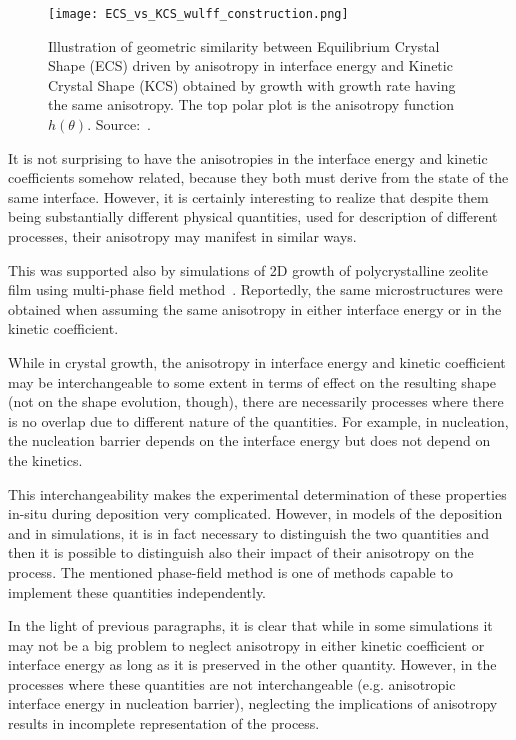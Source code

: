 \begin{figure}
	\centering
	\texttt{[image: ECS\_vs\_KCS\_wulff\_construction.png]}
	\caption{Illustration of geometric similarity between Equilibrium Crystal Shape (ECS) driven by anisotropy in interface energy and Kinetic Crystal Shape (KCS) obtained by growth with growth rate having the same anisotropy. The top polar plot is the anisotropy function $h(\theta)$. Source:~\cite{Salvalaglio2015}.}
	\label{fig_ECS_vs_KCS_wulff_construction}
\end{figure}

It is not surprising to have the anisotropies in the interface energy and kinetic coefficients somehow related, because they both must derive from the state of the same interface. However, it is certainly interesting to realize that despite them being substantially different physical quantities, used for description of different processes, their anisotropy may manifest in similar ways. 

This was supported also by simulations of 2D growth of polycrystalline zeolite film using multi-phase field method~\cite{Wendler2011}. Reportedly, the same microstructures were obtained when assuming the same anisotropy in either interface energy or in the kinetic coefficient. 

While in crystal growth, the anisotropy in interface energy and kinetic coefficient may be interchangeable to some extent in terms of effect on the resulting shape (not on the shape evolution, though), there are necessarily processes where there is no overlap due to different nature of the quantities. For example, in nucleation, the nucleation barrier depends on the interface energy but does not depend on the kinetics. 

This interchangeability makes the experimental determination of these properties in-situ during deposition very complicated. However, in models of the deposition and in simulations, it is in fact necessary to distinguish the two quantities and then it is possible to distinguish also their impact of their anisotropy on the process. The mentioned phase-field method is one of methods capable to implement these quantities independently.

In the light of previous paragraphs, it is clear that while in some simulations it may not be a big problem to neglect anisotropy in either kinetic coefficient or interface energy as long as it is preserved in the other quantity. However, in the processes where these quantities are not interchangeable (e.g. anisotropic interface energy in nucleation barrier), neglecting the implications of anisotropy results in incomplete representation of the process.

